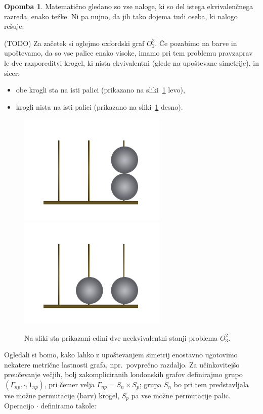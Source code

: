 \documentclass[12pt,a4paper]{amsart}
\theoremstyle{definition} %
\newtheorem{opomba}[definicija]{Opomba}
\theoremstyle{plain} %
\begin{document}
\begin{opomba}
    Matematično gledano so vse naloge, ki so del istega ekvivalenčnega razreda, enako težke. Ni pa nujno, da jih tako dojema tudi oseba, ki nalogo rešuje.
\end{opomba}

(TODO) Za začetek si oglejmo oxfordski graf $O_2^3$. Če pozabimo na barve in upoštevamo, da so vse palice enako visoke, imamo pri tem problemu pravzaprav le dve razporeditvi krogel, ki nista ekvivalentni (glede na upoštevane simetrije), in sicer: 
\begin{itemize}
    \item obe krogli sta na isti palici (prikazano na sliki~\ref{fig:neekviv-oxf-stanji} levo),
    \item krogli nista na isti palici (prikazano na sliki~\ref{fig:neekviv-oxf-stanji} desno).
\end{itemize}

\begin{figure}[h]
    \includegraphics[width=200pt]{img/oxford-tower-O^2_3-towerlike.png}
    \includegraphics[width=200pt]{img/oxford-tower-O^2_3-flat.png}
    \caption{Na sliki sta prikazani edini dve neekvivalentni stanji problema $O^2_3$. }
    \label{fig:neekviv-oxf-stanji}
\end{figure}

Ogledali si bomo, kako lahko z upoštevanjem simetrij enostavno ugotovimo nekatere metrične lastnosti grafa, npr.~povprečno razdaljo. Za učinkovitejšo preučevanje večjih, bolj zakompliciranih londonskih grafov definirajmo grupo $(\Gamma_{np}, \cdot, 1_{np})$, pri čemer velja $\Gamma_{np} = S_n \times S_p$; grupa $S_n$ bo pri tem predstavljala vse možne permutacije (barv) krogel, $S_p$ pa vse možne permutacije palic. Operacijo $\cdot$ definiramo takole:
\end{document}
